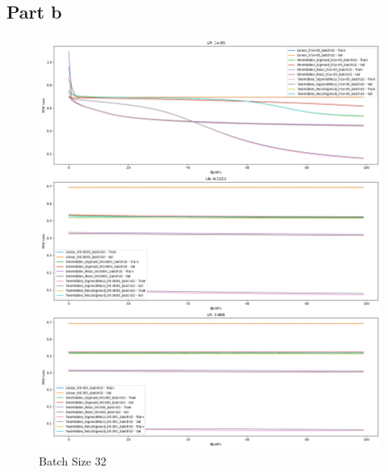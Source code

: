 \subsection*{Part b}
\begin{figure}[!htbp]
    \centering
    \begin{minipage}{0.32\linewidth}
        \includegraphics[width=\linewidth]{crossentropy_batch32.png}
        \caption{Batch Size 32}
    \end{minipage}
    \hfill
    \begin{minipage}{0.32\linewidth}

\end{minipage}
\end{figure}
